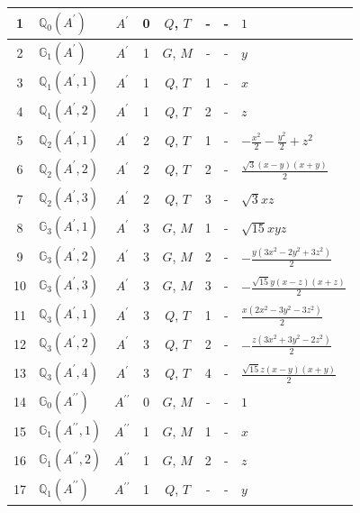 \documentclass[fleqn,10pt,landscape]{jsarticle}
\begin{document}
\begin{longtable}[l]{clcccccl}
1 & $\mathbb{Q}_{0}(A^{\prime})$ & $A^{\prime}$ & 0 & $Q$, $T$ & - & - & $1$ \\ \hline
2 & $\mathbb{G}_{1}(A^{\prime})$ & $A^{\prime}$ & 1 & $G$, $M$ & - & - & $y$ \\ \hline
3 & $\mathbb{Q}_{1}(A^{\prime},1)$ & $A^{\prime}$ & 1 & $Q$, $T$ & 1 & - & $x$ \\ \hline
4 & $\mathbb{Q}_{1}(A^{\prime},2)$ & $A^{\prime}$ & 1 & $Q$, $T$ & 2 & - & $z$ \\ \hline
5 & $\mathbb{Q}_{2}(A^{\prime},1)$ & $A^{\prime}$ & 2 & $Q$, $T$ & 1 & - & $- \frac{x^{2}}{2} - \frac{y^{2}}{2} + z^{2}$ \\ \hline
6 & $\mathbb{Q}_{2}(A^{\prime},2)$ & $A^{\prime}$ & 2 & $Q$, $T$ & 2 & - & $\frac{\sqrt{3} \left(x - y\right) \left(x + y\right)}{2}$ \\ \hline
7 & $\mathbb{Q}_{2}(A^{\prime},3)$ & $A^{\prime}$ & 2 & $Q$, $T$ & 3 & - & $\sqrt{3} x z$ \\ \hline
8 & $\mathbb{G}_{3}(A^{\prime},1)$ & $A^{\prime}$ & 3 & $G$, $M$ & 1 & - & $\sqrt{15} x y z$ \\ \hline
9 & $\mathbb{G}_{3}(A^{\prime},2)$ & $A^{\prime}$ & 3 & $G$, $M$ & 2 & - & $- \frac{y \left(3 x^{2} - 2 y^{2} + 3 z^{2}\right)}{2}$ \\ \hline
10 & $\mathbb{G}_{3}(A^{\prime},3)$ & $A^{\prime}$ & 3 & $G$, $M$ & 3 & - & $- \frac{\sqrt{15} y \left(x - z\right) \left(x + z\right)}{2}$ \\ \hline
11 & $\mathbb{Q}_{3}(A^{\prime},1)$ & $A^{\prime}$ & 3 & $Q$, $T$ & 1 & - & $\frac{x \left(2 x^{2} - 3 y^{2} - 3 z^{2}\right)}{2}$ \\ \hline
12 & $\mathbb{Q}_{3}(A^{\prime},2)$ & $A^{\prime}$ & 3 & $Q$, $T$ & 2 & - & $- \frac{z \left(3 x^{2} + 3 y^{2} - 2 z^{2}\right)}{2}$ \\ \hline
13 & $\mathbb{Q}_{3}(A^{\prime},4)$ & $A^{\prime}$ & 3 & $Q$, $T$ & 4 & - & $\frac{\sqrt{15} z \left(x - y\right) \left(x + y\right)}{2}$ \\ \hline
14 & $\mathbb{G}_{0}(A^{\prime\prime})$ & $A^{\prime\prime}$ & 0 & $G$, $M$ & - & - & $1$ \\ \hline
15 & $\mathbb{G}_{1}(A^{\prime\prime},1)$ & $A^{\prime\prime}$ & 1 & $G$, $M$ & 1 & - & $x$ \\ \hline
16 & $\mathbb{G}_{1}(A^{\prime\prime},2)$ & $A^{\prime\prime}$ & 1 & $G$, $M$ & 2 & - & $z$ \\ \hline
17 & $\mathbb{Q}_{1}(A^{\prime\prime})$ & $A^{\prime\prime}$ & 1 & $Q$, $T$ & - & - & $y$ \\ \hline

\end{longtable}
\end{document}
